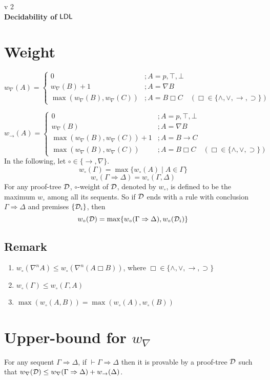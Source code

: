 \documentclass[a4paper, 12pt]{paper}
\begin{document}
{\noindent
	v 2 \\
{\large\textbf{Decidability of $\mathsf{LDL}$}}
}
\\


\section{Weight}
\[
	w_\nabla(A) =
	\begin{cases}
		0 & ; A = p, \top, \bot \\
		w_\nabla(B) + 1 & ; A = \nabla B \\
		\max(w_\nabla(B), w_\nabla(C)) & ; A = B \Box C \quad (\Box \in \{ \wedge, \vee, \rightarrow, \supset \})
	\end{cases}
\]

\[
	w_\rightarrow(A) =
	\begin{cases}
		0 & ; A = p, \top, \bot \\
		w_\nabla(B) & ; A = \nabla B \\
		\max(w_\nabla(B), w_\nabla(C)) + 1 & ; A = B \rightarrow C \\
		\max(w_\nabla(B), w_\nabla(C)) & ; A = B \Box C \quad (\Box \in \{ \wedge, \vee, \supset \})
	\end{cases}
\]
In the following, let $\circ \in \{ \rightarrow, \nabla \}$.
\[ w_\circ(\Gamma) = \max\{w_\circ(A) \mid A \in \Gamma\} \]
\[ w_\circ(\Gamma \Rightarrow \Delta) = w_\circ(\Gamma, \Delta) \]
For any proof-tree $\mathcal{D}$, $\circ$-weight of $\mathcal{D}$, denoted by $w_\circ$, is defined to be the maximum $w_\circ$ among all its sequents. So if $\mathcal{D}$ ends with a rule with conclusion $\Gamma \Rightarrow \Delta$ and premises $\{ \mathcal{D}_i \}$, then
\[ w_\circ(\mathcal{D}) = \max\{w_\circ(\Gamma \Rightarrow \Delta), w_\circ(\mathcal{D}_i)\} \]

\subsection{Remark}\quad
\begin{enumerate}
	\item $w_\circ(\nabla^n A) \le w_\circ(\nabla^n (A \Box B))$, where $\Box \in \{\wedge, \vee, \rightarrow, \supset\}$
	\item $w_\circ(\Gamma) \le w_\circ(\Gamma, A)$
	\item $\max(w_\circ(A, B)) = \max(w_\circ(A), w_\circ(B))$
\end{enumerate}

\section{Upper-bound for $w_\nabla$} For any sequent $\Gamma \Rightarrow \Delta$, if $\vdash \Gamma \Rightarrow \Delta$ then it is provable by a proof-tree $\mathcal{D}$ such that $w_\nabla(\mathcal{D}) \le w_\nabla(\Gamma \Rightarrow \Delta) + w_\rightarrow(\Delta)$.
\end{document}
